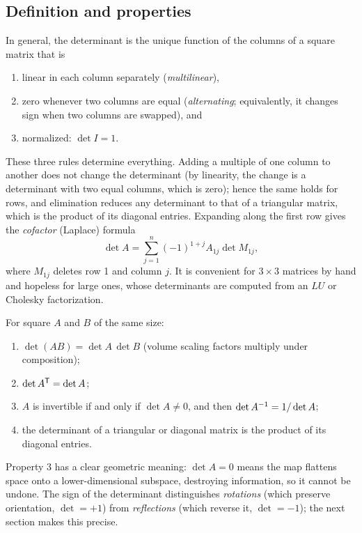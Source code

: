 \subsection{Definition and properties}

In general, the determinant is the unique function of the columns of a square matrix that is
\begin{enumerate}
  \item linear in each column separately (\emph{multilinear}),
  \item zero whenever two columns are equal (\emph{alternating}; equivalently, it changes sign when two columns are
        swapped), and
  \item normalized: $\det I = 1$.
\end{enumerate}
These three rules determine everything. Adding a multiple of one column to another does not change the determinant
(by linearity, the change is a determinant with two equal columns, which is zero); hence the same holds for rows, and
elimination reduces any determinant to that of a triangular matrix, which is the product of its diagonal entries.
Expanding along the first row gives the \emph{cofactor} (Laplace) formula
\begin{equation}
  \det A = \sum_{j=1}^n (-1)^{1+j}A_{1j}\det M_{1j},
\end{equation}
where $M_{1j}$ deletes row 1 and column $j$. It is convenient for $3\times3$ matrices by hand and hopeless for large ones,
whose determinants are computed from an $LU$ or Cholesky factorization.

\begin{proposition}
For square $A$ and $B$ of the same size:
\begin{enumerate}
  \item $\det(AB) = \det A\,\det B$ (volume scaling factors multiply under composition);
  \item $\det A^{\mathsf{T}} = \det A$;
  \item $A$ is invertible if and only if $\det A \ne 0$, and then $\det A^{-1} = 1/\det A$;
  \item the determinant of a triangular or diagonal matrix is the product of its diagonal entries.
\end{enumerate}
\end{proposition}

Property 3 has a clear geometric meaning: $\det A = 0$ means the map flattens space onto a lower-dimensional subspace,
destroying information, so it cannot be undone. The sign of the determinant distinguishes \emph{rotations} (which
preserve orientation, $\det = +1$) from \emph{reflections} (which reverse it, $\det = -1$); the next section makes
this precise.

